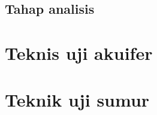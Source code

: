 \subsection{Tahap analisis}








\section{Teknis uji akuifer}






\section{Teknik uji sumur}




